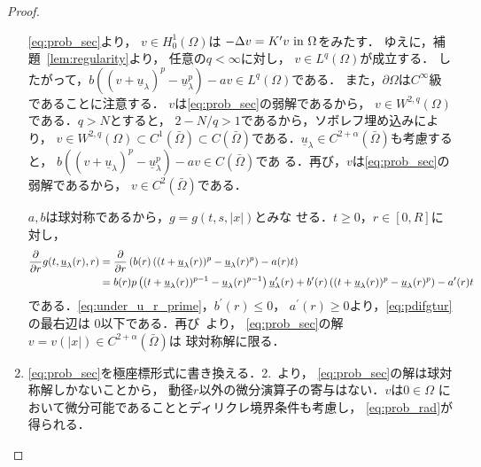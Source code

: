 \begin{proof}
\begin{enumerate}[1.]
        \ref{eq:prob_sec}より，
        $v \in H_0^1(\Omega)$は
        $- \Delta v = K^\prime v ~\text{in}~ \Omega$をみたす．
        ゆえに，補題~\ref{lem:regularity}より，
        任意の$q < \infty$に対し，
        $v \in L^q(\Omega)$が成立する．
        したがって，$b \left( (v+ \underline{u}_\lambda)^p -
        \underline{u}_\lambda^p \right) - av \in L^q(\Omega)$である．
        また，$\partial \Omega$は$C^\infty$級であることに注意する．
        $v$は\ref{eq:prob_sec}の弱解であるから，
        $v \in W^{2, q}(\Omega)$である．$q > N$とすると，
        $2 - N /q > 1$であるから，ソボレフ埋め込みにより，
        $v \in W^{2, q}(\Omega) \subset C^1(\bar{\Omega}) \subset
        C(\bar{\Omega})$である．$\underline{u}_\lambda \in C^{2 +
        \alpha}(\bar{\Omega})$も考慮すると，
        $b \left( (v+ \underline{u}_\lambda)^p -
        \underline{u}_\lambda^p \right) - av \in C(\bar{\Omega})$であ
        る．再び，$v$は\ref{eq:prob_sec}の弱解であるから，
        $v \in C^2(\bar{\Omega})$である．
        
        $a, b$は球対称であるから，$g = g(t, s, \lvert x \rvert)$とみな
        せる．$t \geq 0$，$r \in [0, R]$に対し，
        \begin{align}
         \frac{\partial }{\partial r} g(t, \underline{u}_\lambda(r), r)
         &= \frac{\partial }{\partial r} \left( b(r) \left( (t + \underline{u}
         _\lambda(r))^p -
         \underline{u}_\lambda(r)^p \right) - a(r) t \right) \notag \\
         &= b(r) p \left( (t+ \underline{u}_\lambda(r))^{p-1} -
         \underline{u}_\lambda(r)^{p-1} \right)
         \underline{u}_\lambda^\prime(r) + b^\prime(r) \left( (t +
         \underline{u}_\lambda(r))^p  - \underline{u}_\lambda(r)^p
         \right) - a^\prime(r) t \label{eq:pdifgtur}
        \end{align}
        である．\eqref{eq:under_u_r_prime}，$b^\prime(r) \leq 0$，
        $a^\prime(r) \geq 0$より，\eqref{eq:pdifgtur}の最右辺は
        $0$以下である．再び\cite{MR544879}~より，
        \ref{eq:prob_sec}の解
        $v = v(\lvert x \rvert) \in C^{2+\alpha}(\bar{\Omega})$は
        球対称解に限る．
  \item \ref{eq:prob_sec}を極座標形式に書き換える．2.~より，
        \ref{eq:prob_sec}の解は球対称解しかないことから，
        動径$r$以外の微分演算子の寄与はない．$v$は$0 \in \Omega$
        において微分可能であることとディリクレ境界条件も考慮し，
        \eqref{eq:prob_rad}が得られる．\qedhere
 \end{enumerate}
\end{proof}

